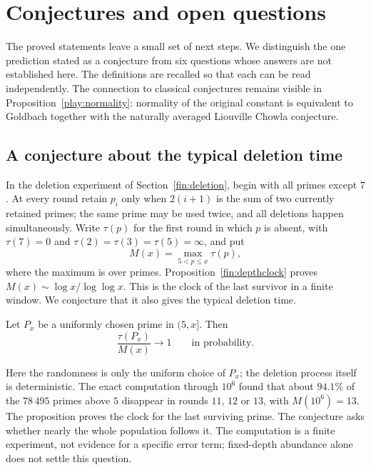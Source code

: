 \section{Conjectures and open questions}\label{open:section}

The proved statements leave a small set of next steps.  We distinguish
the one prediction stated as a conjecture from six questions whose
answers are not established here.  The definitions are recalled so
that each can be read independently.  The connection to classical
conjectures remains visible in Proposition~\ref{play:normality}:
normality of the original constant is equivalent to Goldbach together
with the naturally averaged Liouville Chowla conjecture.

\subsection{A conjecture about the typical deletion time}

In the deletion experiment of Section~\ref{fin:deletion}, begin with
all primes except $7$.  At every round retain $p_i$ only when
$2(i+1)$ is the sum of two currently retained primes; the same
prime may be used twice, and all deletions happen simultaneously.
Write $\tau(p)$ for the first round in which $p$ is absent, with
$\tau(7)=0$ and $\tau(2)=\tau(3)=\tau(5)=\infty$, and put
\[
 M(x)=\max_{5<p\le x}\tau(p),
\]
where the maximum is over primes.  Proposition~\ref{fin:depthclock}
proves $M(x)\sim\log x/\log\log x$.  This is the clock of the
last survivor in a finite window.  We conjecture that it also gives
the typical deletion time.

\begin{conjecture}\label{fin:typicaldepth}
Let $P_x$ be a uniformly chosen prime in $(5,x]$.
Then
\[
 \frac{\tau(P_x)}{M(x)}\longrightarrow1
 \qquad\text{in probability}.
\]
\end{conjecture}

Here the randomness is only the uniform choice of $P_x$; the deletion
process itself is deterministic.  The exact computation through
$10^6$ found that about $94.1\%$ of the $78\,495$ primes above $5$
disappear in rounds $11$, $12$ or $13$, with $M(10^6)=13$.
The proposition proves the clock for the last surviving prime.
The conjecture asks whether nearly the whole population follows it.
The computation is a finite experiment, not evidence for a specific
error term; fixed-depth abundance alone does not settle this question.

